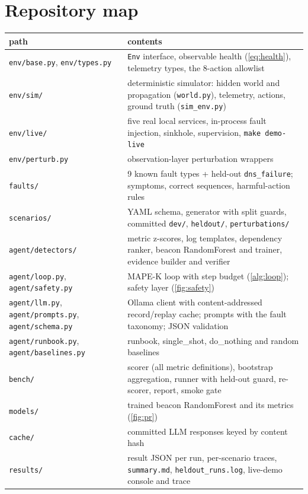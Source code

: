 \documentclass[11pt,a4paper]{article}
\newcommand{\code}[1]{\texttt{#1}}
\begin{document}
\section{Repository map}
\label{app:map}
\begin{table}[H]
\centering\small
\begin{tabularx}{\textwidth}{l X}
\toprule
path & contents \\
\midrule
\code{env/base.py}, \code{env/types.py} & \code{Env} interface, observable health (\cref{eq:health}), telemetry types, the 8-action allowlist \\
\code{env/sim/} & deterministic simulator: hidden world and propagation (\code{world.py}), telemetry, actions, ground truth (\code{sim\_env.py}) \\
\code{env/live/} & five real local services, in-process fault injection, sinkhole, supervision, \code{make demo-live} \\
\code{env/perturb.py} & observation-layer perturbation wrappers \\
\code{faults/} & 9 known fault types + held-out \code{dns\_failure}; symptoms, correct sequences, harmful-action rules \\
\code{scenarios/} & YAML schema, generator with split guards, committed \code{dev/}, \code{heldout/}, \code{perturbations/} \\
\code{agent/detectors/} & metric z-scores, log templates, dependency ranker, beacon RandomForest and trainer, evidence builder and verifier \\
\code{agent/loop.py}, \code{agent/safety.py} & MAPE-K loop with step budget (\cref{alg:loop}); safety layer (\cref{fig:safety}) \\
\code{agent/llm.py}, \code{agent/prompts.py}, \code{agent/schema.py} & Ollama client with content-addressed record/replay cache; prompts with the fault taxonomy; JSON validation \\
\code{agent/runbook.py}, \code{agent/baselines.py} & runbook, single\_shot, do\_nothing and random baselines \\
\code{bench/} & scorer (all metric definitions), bootstrap aggregation, runner with held-out guard, re-scorer, report, smoke gate \\
\code{models/} & trained beacon RandomForest and its metrics (\cref{fig:pr}) \\
\code{cache/} & committed LLM responses keyed by content hash \\
\code{results/} & result JSON per run, per-scenario traces, \code{summary.md}, \code{heldout\_runs.log}, live-demo console and trace \\

\end{tabularx}
\end{table}
\end{document}
